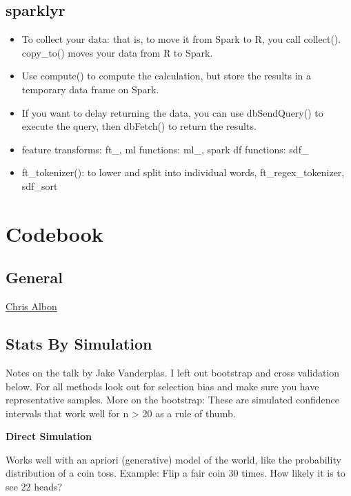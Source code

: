 \documentclass[]{book}
\begin{document}
\section{sparklyr}\label{sparklyr}

\begin{itemize}
\item
  To collect your data: that is, to move it from Spark to R, you call
  collect(). copy\_to() moves your data from R to Spark.
\item
  Use compute() to compute the calculation, but store the results in a
  temporary data frame on Spark.
\item
  If you want to delay returning the data, you can use dbSendQuery() to
  execute the query, then dbFetch() to return the results.
\item
  feature transforms: ft\_, ml functions: ml\_, spark df functions:
  sdf\_
\item
  ft\_tokenizer(): to lower and split into individual words,
  ft\_regex\_tokenizer, sdf\_sort
\end{itemize}

\chapter{Codebook}\label{codebook}

\section{General}\label{general-12}

\href{http://chrisalbon.com/}{Chris Albon}

\section{Stats By Simulation}\label{stats-by-simulation}

Notes on the talk by Jake Vanderplas. I left out bootstrap and cross
validation below. For all methods look out for selection bias and make
sure you have representative samples. More on the bootstrap: These are
simulated confidence intervals that work well for n \textgreater{} 20 as
a rule of thumb.

\textbf{Direct Simulation}

Works well with an apriori (generative) model of the world, like the
probability distribution of a coin toss. Example: Flip a fair coin 30
times. How likely it is to see 22 heads?
\end{document}
